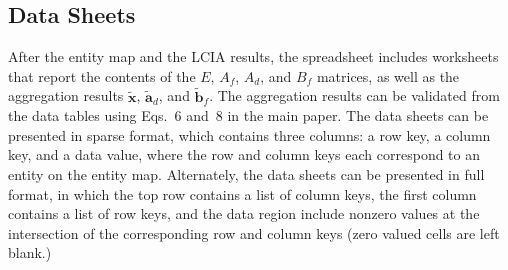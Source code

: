\subsection{Data Sheets}

After the entity map and the LCIA results, the spreadsheet includes worksheets that report the contents of the $E$, $A_f$, $A_d$, and $B_f$ matrices, as well as the aggregation results $\tilde{\mathbf{x}}$, $\tilde{\mathbf{a}}_d$, and $\tilde{\mathbf{b}}_f$.  The aggregation results can be validated from the data tables using Eqs.~6 and~8 in the main paper.  The data sheets can be presented in sparse format, which contains three columns: a row key, a column key, and a data value, where the row and column keys each correspond to an entity on the entity map.  Alternately, the data sheets can be presented in full format, in which the top row contains a list of column keys, the first column contains a list of row keys, and the data region include nonzero values at the intersection of the corresponding row and column keys (zero valued cells are left blank.)
